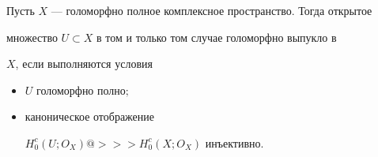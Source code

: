  


\begin{lem} 


Пусть $X$ --- голоморфно полное комплексное пространство. Тогда открытое 


множество $U\subset X$ в том и только том случае голоморфно выпукло в 


$X$, если выполняются условия 


\begin{itemize} 


\item[a)] $U$ голоморфно полно$;$ 


\item[a)] каноническое отображение 


$H^c_0(U;O_X)@>>>H^c_0(X;O_X)$ инъективно. 


\end{itemize} 


\end{lem} 


 


